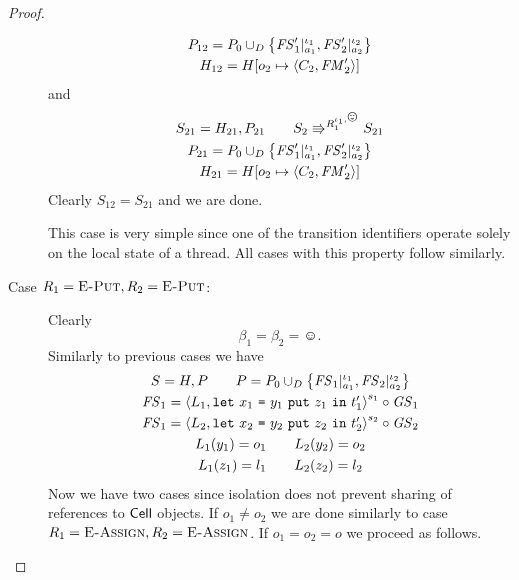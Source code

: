\begin{proof}
\begin{description}
\begin{equation}
\begin{gathered}
          P_{12} = P_0 \cup_D \left\{ \mathit{FS}'_1|_{a_1}^{\iota_1},
          \mathit{FS}'_2|_{a_2}^{\iota_2} \right\} \\
          H_{12} = H[o_2 \mapsto \mbox{$\langle C_2, \mathit{FM}'_2 \rangle$}]
        \end{gathered}
      \end{equation}
      and 
      \begin{equation}
        \begin{gathered}
          S_{21} = H_{21}, P_{21} \andalso S_2 \Rrightarrow^{R_1^{\iota_1,
          \smiley}} S_{21}
          \\
          P_{21} = P_0 \cup_D \left\{ \FS'_1|_{a_1}^{\iota_1},
          \FS'_2|_{a_2}^{\iota_2} \right\} \\
          H_{21} = H[o_2 \mapsto \Obj{C_2, \FM'_2}]
        \end{gathered}
      \end{equation}
      Clearly $S_{12} = S_{21}$ and we are done.
      \begin{remark}
        This case is very simple since one of the transition identifiers
        operate solely on the local state of a thread. All cases with this
        property follow similarly.
      \end{remark}
    \item[Case $R_1 = \mbox{{\sc E-Put}}, R_2 = \mbox{{\sc E-Put}}$:] Clearly
      \begin{equation*}
        \beta_1 = \beta_2 = \smiley.
      \end{equation*}
      Similarly to previous cases we have
      \begin{equation}
        \begin{gathered}
          S = H, P \quad\quad P = P_0 \cup_D \left\{ \mathit{FS}_1|_{a_1}^{\iota_1},
          \mathit{FS}_2|_{a_2}^{\iota_2} \right\} \\
          \mathit{FS}_1 = \mbox{$\langle L_1, \mbox{\mdseries\texttt{let}~$x_1$~\texttt{=}~$\mbox{\mdseries$y_1$~\texttt{put}~$z_1$}$~\texttt{in}~$t'_1$} \rangle$}^{s_1} \circ \mathit{GS}_1
          \\ 
          \mathit{FS}_1 = \mbox{$\langle L_2, \mbox{\mdseries\texttt{let}~$x_2$~\texttt{=}~$\mbox{\mdseries$y_2$~\texttt{put}~$z_2$}$~\texttt{in}~$t'_2$} \rangle$}^{s_2}
          \circ \mathit{GS}_2 \\
          L_1(y_1) = o_1 \quad\quad L_2(y_2) = o_2 \\
          L_1(z_1) = l_1 \quad\quad L_2(z_2) = l_2
        \end{gathered}
      \end{equation}
      Now we have two cases since isolation does not prevent sharing of
      references to $\mbox{$\mathsf{Cell}$}$ objects. If $o_1 \neq o_2$ we are done similarly
      to case $R_1 = \mbox{{\sc E-Assign}}, R_2 = \mbox{{\sc E-Assign}}$. If $o_1 = o_2 = o$ we proceed as
      follows.
      

\end{description}
\end{proof}
